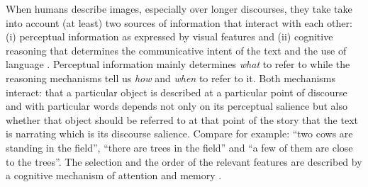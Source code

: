 \documentclass[11pt,a4paper]{article}
\begin{document}
When humans describe images, especially over longer discourses, they take take into account (at least) two sources of information that interact with each other: (i) perceptual information as expressed by visual features and (ii) cognitive reasoning that determines the communicative intent of the text and the use of language \cite{Kelleher:2020aa}.
Perceptual information mainly determines \emph{what} to refer to while the reasoning mechanisms tell us \emph{how} and \emph{when} to refer to it.
Both mechanisms interact: that a particular object is described at a particular point of discourse and with particular words depends not only on its perceptual salience but also whether that object should be referred to at that point of the story that the text is narrating which is its discourse salience.
Compare for example: ``two cows are standing in the field'', ``there are trees in the field'' and ``a few of them are close to the trees''.
The selection and the order of the relevant features are described by a cognitive mechanism of attention and memory \cite{Lavie:2004aa,Dobnik:2016ac}.
\end{document}
